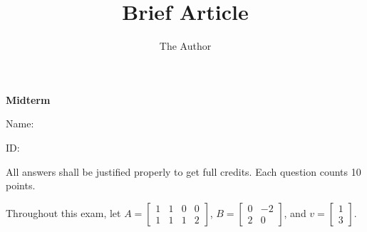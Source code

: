 \documentclass[11pt]{amsart}
\title{Brief Article}
\author{The Author}
\begin{document}

\begin{center}
{\bf Midterm}
\end{center}

Name: 

ID: 

All answers shall be justified properly to get full credits. Each question counts 10 points.
\vspace{.2in}

Throughout this exam, let 
$A = 
\begin{bmatrix}
1 & 1 & 0& 0\\
1 & 1 & 1 & 2
\end{bmatrix}
$, 
$B = \begin{bmatrix}
0 & -2 \\
2 & 0
\end{bmatrix}
$,
and 
$
v
 = 
\begin{bmatrix}
1\\
3
\end{bmatrix}
$.
\vspace{.2in}
\end{document}
